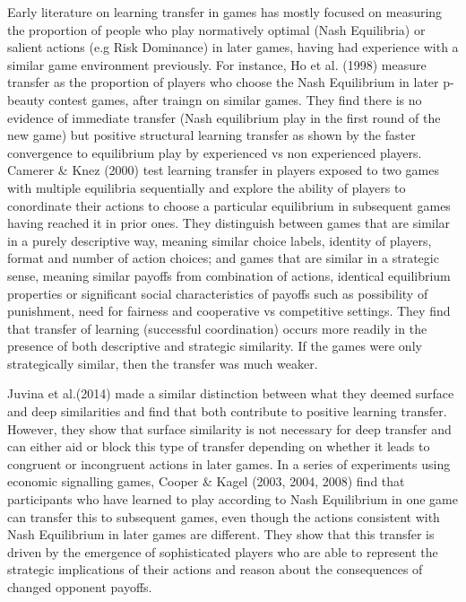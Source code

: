 \documentclass[,man,floatsintext]{apa6}
\begin{document}
Early literature on learning transfer in games has mostly focused on measuring the proportion of people who play normatively optimal (Nash Equilibria) or salient actions (e.g Risk Dominance) in later games, having had experience with a similar game environment previously. For instance, Ho et al. (1998) measure transfer as the proportion of players who choose the Nash Equilibrium in later p-beauty contest games, after traingn on similar games. They find there is no evidence of immediate transfer (Nash equilibrium play in the first round of the new game) but positive structural learning transfer as shown by the faster convergence to equilibrium play by experienced vs non experienced players. Camerer \& Knez (2000) test learning transfer in players exposed to two games with multiple equilibria sequentially and explore the ability of players to conordinate their actions to choose a particular equilibrium in subsequent games having reached it in prior ones. They distinguish between games that are similar in a purely descriptive way, meaning similar choice labels, identity of players, format and number of action choices; and games that are similar in a strategic sense, meaning similar payoffs from combination of actions, identical equilibrium properties or significant social characteristics of payoffs such as possibility of punishment, need for fairness and cooperative vs competitive settings. They find that transfer of learning (successful coordination) occurs more readily in the presence of both descriptive and strategic similarity. If the games were only strategically similar, then the transfer was much weaker.

Juvina et al.(2014) made a similar distinction between what they deemed surface and deep similarities and find that both contribute to positive learning transfer. However, they show that surface similarity is not necessary for deep transfer and can either aid or block this type of transfer depending on whether it leads to congruent or incongruent actions in later games. In a series of experiments using economic signalling games, Cooper \& Kagel (2003, 2004, 2008) find that participants who have learned to play according to Nash Equilibrium in one game can transfer this to subsequent games, even though the actions consistent with Nash Equilibrium in later games are different. They show that this transfer is driven by the emergence of sophisticated players who are able to represent the strategic implications of their actions and reason about the consequences of changed opponent payoffs.
\end{document}

